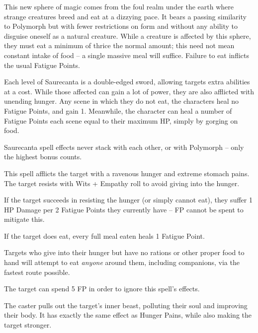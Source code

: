 \begin{multicols}{2}

\noindent
This new sphere of magic comes from the foul realm under the earth where strange creatures breed and eat at a dizzying pace.
It bears a passing similarity to Polymorph but with fewer restrictions on form and without any ability to disguise oneself as a natural creature.
While a creature is affected by this sphere, they must eat a minimum of thrice the normal amount; this need not mean constant intake of food -- a single massive meal will suffice.
Failure to eat inflicts the usual Fatigue Points.

Each level of Saurecanta is a double-edged sword, allowing targets extra abilities at a cost.
While those affected can gain a lot of power, they are also afflicted with unending hunger.
Any scene in which they do not eat, the characters heal no Fatigue Points, and gain 1.
Meanwhile, the character can heal a number of Fatigue Points each scene equal to their maximum HP, simply by gorging on food.

Saurecanta spell effects never stack with each other, or with Polymorph -- only the highest bonus counts.

\spelllevel \label{saurecantaone}


This spell afflicts the target with a ravenous hunger and extreme stomach pains.
The target resists with Wits + Empathy roll to avoid giving into the hunger.

If the target succeeds in resisting the hunger (or simply cannot eat), they suffer 1 HP Damage per 2 Fatigue Points they currently have -- FP cannot be spent to mitigate this.

If the target does eat, every full meal eaten heals 1 Fatigue Point.

Targets who give into their hunger but have no rations or other proper food to hand will attempt to eat \emph{anyone} around them, including companions, via the fastest route possible.

The target can spend 5 FP in order to ignore this spell's effects.

\spelllevel


The caster pulls out the target's inner beast, polluting their soul and improving their body.
It has exactly the same effect as Hunger Pains, while also making the target stronger.


\end{multicols}
